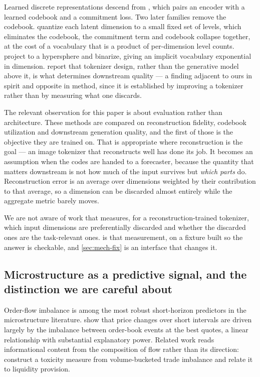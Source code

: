 Learned discrete representations descend from \citet{oord2017vqvae}, which pairs an encoder with a
learned codebook and a commitment loss. Two later families remove the codebook.
\citet{mentzer2024fsq} quantize each latent dimension to a small fixed set of levels, which
eliminates the codebook, the commitment term and codebook collapse together, at the cost of a
vocabulary that is a product of per-dimension level counts. \citet{zhao2024bsq} project to a
hypersphere and binarize, giving an implicit vocabulary exponential in dimension.
\citet{yu2024lfq} report that tokenizer design, rather than the generative model above it, is what
determines downstream quality --- a finding adjacent to ours in spirit and opposite in method,
since it is established by improving a tokenizer rather than by measuring what one discards.

The relevant observation for this paper is about evaluation rather than architecture. These
methods are compared on reconstruction fidelity, codebook utilization and downstream generation
quality, and the first of those is the objective they are trained on. That is appropriate where
reconstruction is the goal --- an image tokenizer that reconstructs well has done its job. It
becomes an assumption when the codes are handed to a forecaster, because the quantity that matters
downstream is not how much of the input survives but \emph{which parts} do. Reconstruction error
is an average over dimensions weighted by their contribution to that average, so a dimension can
be discarded almost entirely while the aggregate metric barely moves.

We are not aware of work that measures, for a reconstruction-trained tokenizer, which input
dimensions are preferentially discarded and whether the discarded ones are the task-relevant ones.
 is that measurement, on a fixture built so the answer is checkable, and
\cref{sec:mech-fix} is an interface that changes it.

\subsection{Microstructure as a predictive signal, and the distinction we are careful about}
\label{sec:rel-micro}

Order-flow imbalance is among the most robust short-horizon predictors in the microstructure
literature. \citet{cont2014ofi} show that price changes over short intervals are driven largely by
the imbalance between order-book events at the best quotes, a linear relationship with substantial
explanatory power. Related work reads informational content from the composition of flow rather
than its direction: \citet{easley2012vpin} construct a toxicity measure from volume-bucketed trade
imbalance and relate it to liquidity provision.

